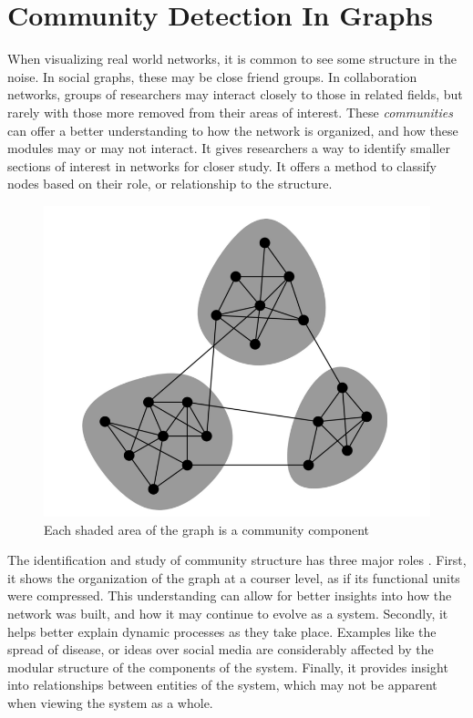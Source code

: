 \section{Community Detection In Graphs}
When visualizing real world networks, it is common to see some structure in the noise. In social graphs, these may be close friend groups. In collaboration networks, groups of researchers may interact closely to those in related fields, but rarely with those more removed from their areas of interest. These \textit{communities} can offer a better understanding to how the network is organized, and how these modules may or may not interact. It gives researchers a way to identify smaller sections of interest in networks for closer study. It offers a method to classify nodes based on their role, or relationship to the structure.
\begin{figure}[!h]
	\begin{center}
		\includegraphics[scale=0.7]{images/communities.png}
	\end{center}
	\caption{Each shaded area of the graph is a community component}
	\label{logo}
\end{figure}


The identification and study of community structure has three major roles \cite{Lancichinetti2010}. First, it shows the organization of the graph at a courser level, as if its functional units were compressed. This understanding can allow for better insights into how the network was built, and how it may continue to evolve as a system. Secondly, it helps better explain dynamic processes as they take place. Examples like the spread of disease, or ideas over social media are considerably affected by the modular structure of the components of the system. Finally, it provides insight into relationships between entities of the system, which may not be apparent when viewing the system as a whole. 

